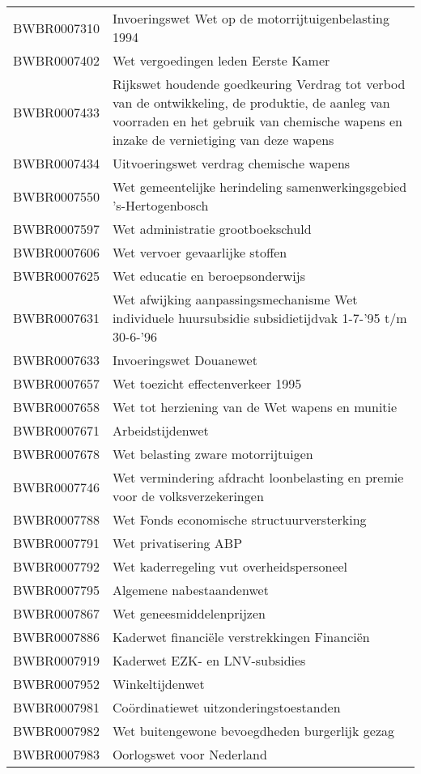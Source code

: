 \begin{longtable}{lp{}}
BWBR0007310 & Invoeringswet Wet op de motorrijtuigenbelasting 1994 \\
BWBR0007402 & Wet vergoedingen leden Eerste Kamer \\
BWBR0007433 & Rijkswet houdende goedkeuring Verdrag tot verbod van de ontwikkeling, de produktie, de aanleg van voorraden en het gebruik van chemische wapens en inzake de vernietiging van deze wapens \\
BWBR0007434 & Uitvoeringswet verdrag chemische wapens \\
BWBR0007550 & Wet gemeentelijke herindeling samenwerkingsgebied 's-Hertogenbosch \\
BWBR0007597 & Wet administratie grootboekschuld \\
BWBR0007606 & Wet vervoer gevaarlijke stoffen \\
BWBR0007625 & Wet educatie en beroepsonderwijs \\
BWBR0007631 & Wet afwijking aanpassingsmechanisme Wet individuele huursubsidie subsidietijdvak 1-7-'95 t/m 30-6-'96 \\
BWBR0007633 & Invoeringswet Douanewet \\
BWBR0007657 & Wet toezicht effectenverkeer 1995 \\
BWBR0007658 & Wet tot herziening van de Wet wapens en munitie \\
BWBR0007671 & Arbeidstijdenwet \\
BWBR0007678 & Wet belasting zware motorrijtuigen \\
BWBR0007746 & Wet vermindering afdracht loonbelasting en premie voor de volksverzekeringen \\
BWBR0007788 & Wet Fonds economische structuurversterking \\
BWBR0007791 & Wet privatisering ABP \\
BWBR0007792 & Wet kaderregeling vut overheidspersoneel \\
BWBR0007795 & Algemene nabestaandenwet \\
BWBR0007867 & Wet geneesmiddelenprijzen \\
BWBR0007886 & Kaderwet financiële verstrekkingen Financiën \\
BWBR0007919 & Kaderwet EZK- en LNV-subsidies \\
BWBR0007952 & Winkeltijdenwet \\
BWBR0007981 & Coördinatiewet uitzonderingstoestanden \\
BWBR0007982 & Wet buitengewone bevoegdheden burgerlijk gezag \\
BWBR0007983 & Oorlogswet voor Nederland \\

\end{longtable}
